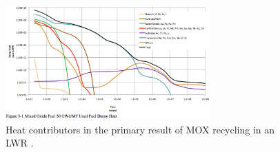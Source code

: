 \begin{figure}[htbp!]
  \begin{center}
    \includegraphics[width=0.7\textwidth]{./images/carter_lwr_mox_heat.eps}
  \end{center}
  \caption{Heat contributors in the primary result of MOX recycling in an LWR
    \cite{carter_us_2011}.}
  \label{fig:carter_lwr_mox_heat}
\end{figure}

